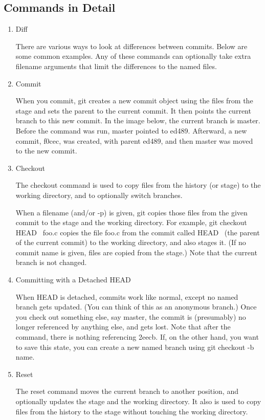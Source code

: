 \documentclass[a4paper]{article}
\begin{document}
\begin{CJK}{UTF8}{mj}
\subsection{Commands in Detail}

\begin{enumerate}[label=(\alph*)]
\item Diff

There are various ways to look at differences between commits. Below are some common examples. Any of these commands can optionally take extra filename arguments that limit the differences to the named files.

\item Commit

When you commit, git creates a new commit object using the files from the stage and sets the parent to the current commit. It then points the current branch to this new commit. In the image below, the current branch is master. Before the command was run, master pointed to ed489. Afterward, a new commit, f0cec, was created, with parent ed489, and then master was moved to the new commit.

\item Checkout

The checkout command is used to copy files from the history (or stage) to the working directory, and to optionally switch branches.

When a filename (and/or -p) is given, git copies those files from the given commit to the stage and the working directory. For example, git checkout HEAD~ foo.c copies the file foo.c from the commit called HEAD~ (the parent of the current commit) to the working directory, and also stages it. (If no commit name is given, files are copied from the stage.) Note that the current branch is not changed.
\newpage
\item Committing with a Detached HEAD

When HEAD is detached, commits work like normal, except no named branch gets updated. (You can think of this as an anonymous branch.)
Once you check out something else, say master, the commit is (presumably) no longer referenced by anything else, and gets lost. Note that after the command, there is nothing referencing 2eecb.
If, on the other hand, you want to save this state, you can create a new named branch using git checkout -b name.

\item Reset

The reset command moves the current branch to another position, and optionally updates the stage and the working directory. It also is used to copy files from the history to the stage without touching the working directory.


\end{enumerate}
\end{CJK}
\end{document}
